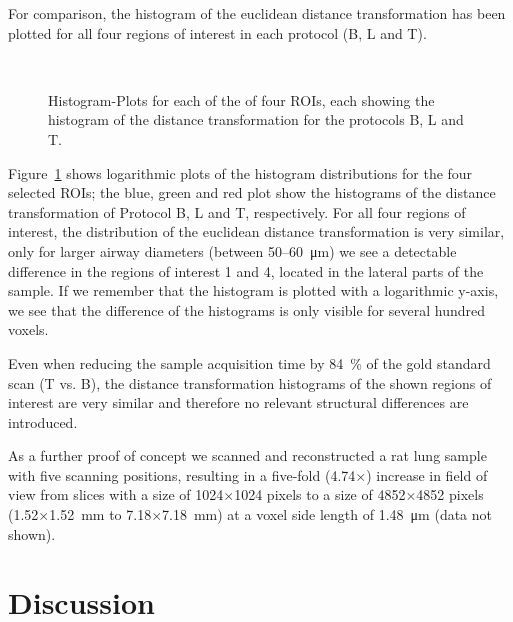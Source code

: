\documentclass[preprint,s]{iucr}
\newcommand{\imsize}{\linewidth}
\begin{document}
For comparison, the histogram of the euclidean distance transformation has been plotted for all four regions of interest in each protocol (B, L and T).

\renewcommand{\imsize}{.5\columnwidth}
\begin{figure}
	\centering
	\caption{Histogram-Plots for each of the of four ROIs, each showing the histogram of the distance transformation for the protocols B, L and T.}%
	\\%
	\label{fig:DTFplots}
\end{figure}

Figure~\ref{fig:DTFplots} shows logarithmic plots of the histogram distributions for the four selected ROIs; the blue, green and red plot show the histograms of the distance transformation of Protocol B, L and T, respectively. For all four regions of interest, the distribution of the euclidean distance transformation is very similar, only for larger airway diameters (between 50--\SI{60}{\micro\meter}) we see a detectable difference in the regions of interest 1 and 4, located in the lateral parts of the sample. If we remember that the histogram is plotted with a logarithmic y-axis, we see that the difference of the histograms is only visible for several hundred voxels.

Even when reducing the sample acquisition time by \SI{84}{\percent} of the gold standard scan (T vs. B), the distance transformation histograms of the shown regions of interest are very similar and therefore no relevant structural differences are introduced.

As a further proof of concept we scanned and reconstructed a rat lung sample with five scanning positions, resulting in a five-fold (4.74$\times$) increase in field of view from slices with a size of 1024$\times$1024 pixels to a size of 4852$\times$4852 pixels (1.52$\times$\SI{1.52}{\milli\meter} to 7.18$\times$\SI{7.18}{\milli\meter}) at a voxel side length of \SI{1.48}{\micro\meter} (data not shown).


\section{Discussion}\label{sec:Discussion}
\end{document}
